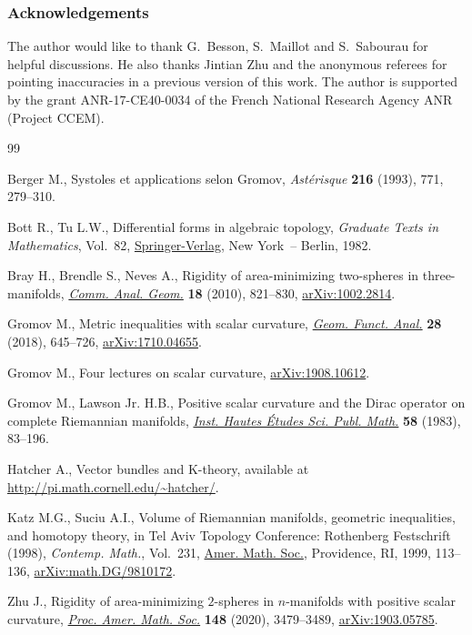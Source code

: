 \documentclass[10pt,a4paper]{amsart}
\numberwithin{equation}{section}
\begin{document}
\subsubsection*{Acknowledgements}

The author would like to thank G.~Besson, S.~Maillot and S.~Sabourau for helpful discussions. He also thanks Jintian Zhu and the anonymous referees for pointing inaccuracies in a previous version of this work. The author is supported by the grant ANR-17-CE40-0034 of the French National Research Agency ANR (Project CCEM).


\begin{thebibliography}{99}
\footnotesize\itemsep=0pt

Berger M., Systoles et applications selon {G}romov, \textit{Ast\'erisque}
 \textbf{216} (1993), 771, 279--310.

Bott R., Tu L.W., Differential forms in algebraic topology, \textit{Graduate
 Texts in Mathematics}, Vol.~82, \href{https://doi.org/10.1007/978-1-4757-3951-0}{Springer-Verlag}, New York~-- Berlin, 1982.

Bray H., Brendle S., Neves A., Rigidity of area-minimizing two-spheres in
 three-manifolds, \href{https://doi.org/10.4310/CAG.2010.v18.n4.a6}{\textit{Comm. Anal. Geom.}} \textbf{18} (2010), 821--830,
 \href{https://arxiv.org/abs/1002.2814}{arXiv:1002.2814}.

Gromov M., Metric inequalities with scalar curvature, \href{https://doi.org/10.1007/s00039-018-0453-z}{\textit{Geom. Funct.
 Anal.}} \textbf{28} (2018), 645--726, \href{https://arxiv.org/abs/1710.04655}{arXiv:1710.04655}.

Gromov M., Four lectures on scalar curvature, \href{https://arxiv.org/abs/1908.10612}{arXiv:1908.10612}.

Gromov M., Lawson Jr. H.B., Positive scalar curvature and the {D}irac operator
 on complete {R}iemannian manifolds, \href{https://doi.org/10.1007/BF02953774}{\textit{Inst. Hautes \'Etudes Sci. Publ.
 Math.}} \textbf{58} (1983), 83--196.

Hatcher A., Vector bundles and K-theory, available at
 \url{http://pi.math.cornell.edu/~hatcher/}.

Katz M.G., Suciu A.I., Volume of {R}iemannian manifolds, geometric
 inequalities, and homotopy theory, in Tel {A}viv {T}opology {C}onference:
 {R}othenberg {F}estschrift (1998), \textit{Contemp. Math.}, Vol.~231, \href{https://doi.org/10.1090/conm/231/03357}{Amer.
 Math. Soc.}, Providence, RI, 1999, 113--136, \href{https://arxiv.org/abs/math.DG/9810172}{arXiv:math.DG/9810172}.

Zhu J., Rigidity of area-minimizing {$2$}-spheres in {$n$}-manifolds with
 positive scalar curvature, \href{https://doi.org/10.1090/proc/15033}{\textit{Proc. Amer. Math. Soc.}} \textbf{148}
 (2020), 3479--3489, \href{https://arxiv.org/abs/1903.05785}{arXiv:1903.05785}.

\end{thebibliography}
\end{document}
